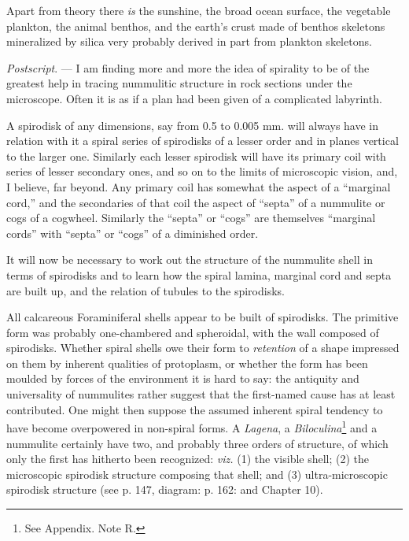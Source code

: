 \documentclass[a4paper, 12pt, oneside]{article}
\begin{document}
Apart from theory there \emph{is} the sunshine, the broad ocean surface, the vegetable plankton, the animal benthos, and the earth's crust made of benthos skeletons mineralized by silica very probably derived in part from plankton skeletons.

\emph{Postscript}. --- I am finding more and more the idea of spirality to be of the greatest help in tracing nummulitic structure in rock sections under the microscope. Often it is as if a plan had been given of a complicated labyrinth.

A spirodisk of any dimensions, say from 0.5 to 0.005 mm. will always have in relation with it a spiral series of spirodisks of a lesser order and in planes vertical to the larger one. Similarly each lesser spirodisk will have its primary coil with series of lesser secondary ones, and so on to the limits of microscopic vision, and, I believe, far beyond. Any primary coil has somewhat the aspect of a ``marginal cord,'' and the secondaries of that coil the aspect of ``septa'' of a nummulite or cogs of a cogwheel. Similarly the ``septa'' or ``cogs'' are themselves ``marginal cords'' with ``septa'' or ``cogs'' of a diminished order.

It will now be necessary to work out the structure of the nummulite shell in terms of spirodisks and to learn how the spiral lamina, marginal cord and septa are built up, and the relation of tubules to the spirodisks.

All calcareous Foraminiferal shells appear to be built of spirodisks. The primitive form was probably one-chambered and spheroidal, with the wall composed of spirodisks. Whether spiral shells owe their form to \emph{retention} of a shape impressed on them by inherent qualities of protoplasm, or whether the form has been moulded by forces of the environment it is hard to say: the antiquity and universality of nummulites rather suggest that the first-named cause has at least contributed. One might then suppose the assumed inherent spiral tendency to have become overpowered in non-spiral forms. A \emph{Lagena}, a \emph{Biloculina}\footnote{See Appendix. Note R.} and a nummulite certainly have two, and probably three orders of structure, of which only the first has hitherto been recognized: \emph{viz.} (1) the visible shell; (2) the microscopic spirodisk structure composing that shell; and (3) ultra-microscopic spirodisk structure (see p. 147, diagram: p. 162: and Chapter 10).
\clearpage
\end{document}
